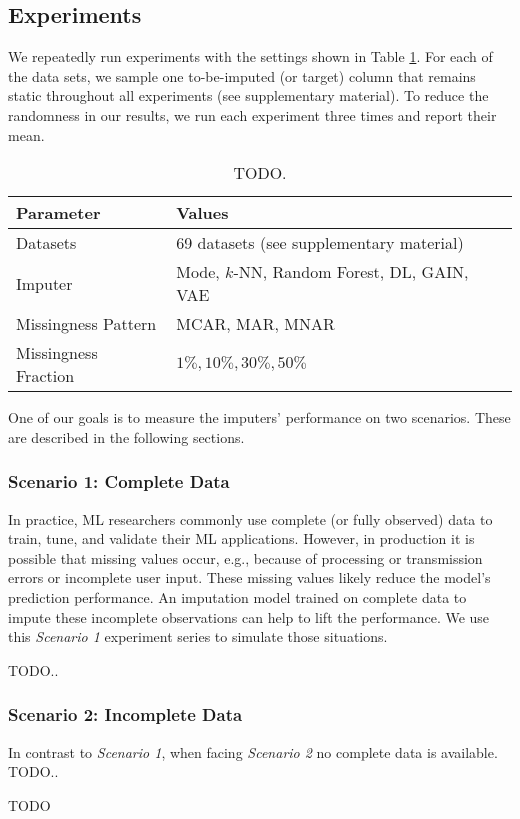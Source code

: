 \subsection{Experiments}
%
We repeatedly run experiments with the settings shown in Table \ref{tab:experiment_settings}. For each of the data sets, we sample one to-be-imputed (or target) column that remains static throughout all experiments (see supplementary material). To reduce the randomness in our results, we run each experiment three times and report their mean.
%
\begin{table}[h!]
	\centering
	\begin{tabular}{ll}
		\toprule
		Parameter            & Values                                     \\ \midrule
		Datasets             & 69 datasets (see supplementary material)    \\
		Imputer              & Mode, $k$-NN, Random Forest, DL, GAIN, VAE \\
		Missingness Pattern  & MCAR, MAR, MNAR                            \\
		Missingness Fraction & $1\%, 10\%, 30\%, 50\%$                      \\ \bottomrule
	\end{tabular}
	\caption{TODO.}
	\label{tab:experiment_settings}
\end{table}
%

One of our goals is to measure the imputers' performance on two scenarios. These are described in the following sections.


\subsubsection{Scenario 1: Complete Data}
%
In practice, ML researchers commonly use complete (or fully observed) data to train, tune, and validate their ML applications. However, in production it is possible that missing values occur, e.g., because of processing or transmission errors or incomplete user input. These missing values likely reduce the model's prediction performance. An imputation model trained on complete data to impute these incomplete observations can help to lift the performance. We use this \emph{Scenario 1} experiment series to simulate those situations.

TODO..


\subsubsection{Scenario 2: Incomplete Data}
%
In contrast to \emph{Scenario 1}, when facing \emph{Scenario 2} no complete data is available. TODO..

TODO
